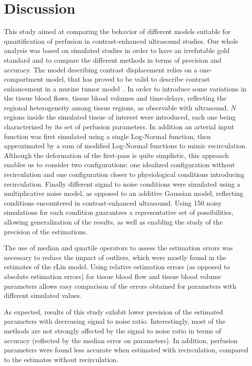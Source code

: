 \section{Discussion}
This study aimed at comparing the behavior of different models suitable for quantification of perfusion in contrast-enhanced ultrasound studies. Our whole analysis was based on simulated studies in order to have an irrefutable gold standard and to compare the different methods in terms of precision and accuracy. The model describing contrast displacement relies on a one-compartment model, that has proved to be valid to describe contrast enhancement in a murine tumor model~\cite{Doury:2017fz}. In order to introduce some variations in the tissue blood flows, tissue blood volumes and time-delays, reflecting the regional heterogeneity among tissue regions, as observable with ultrasound. $N$ regions inside the simulated tissue of interest were introduced, each one being characterized by its set of perfusion parameters. In addition an arterial input function was first simulated using a single Log-Normal function, then approximated by a sum of modified Log-Normal functions to mimic recirculation. Although the deformation of the first-pass is quite simplistic, this approach enables us to consider two configurations: one idealized configuration without recirculation and one configuration closer to physiological conditions introducing recirculation. Finally different signal to noise conditions were simulated using a multiplicative noise model, as opposed to an additive Gaussian model, reflecting conditions encountered in contrast-enhanced ultrasound. Using 150 noisy simulations for each condition guarantees a representative set of possibilities, allowing generalization of the results, as well as enabling the study of the precision of the estimations.

The use of median and quartile operators to assess the estimation errors was necessary to reduce the impact of outliers, which were mostly found in the estimates of the rLin model. Using relative estimation errors (as opposed to absolute estimation errors) for tissue blood flow and tissue blood volume parameters allows easy comparison of the errors obtained for parameters with different simulated values. 

As expected, results of this study exhibit lower precision of the estimated parameters with decreasing signal to noise ratio. Interestingly, most of the methods are not strongly affected by the signal to noise ratio in terms of accuracy (reflected by the median error on parameters). In addition, perfusion parameters were found less accurate when estimated with recirculation, compared to the estimates without recirculation. 

